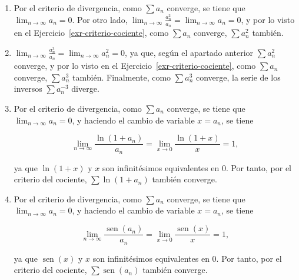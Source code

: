 \documentclass[
  spanish,
  a4paper,
]{scrreport}
\theoremstyle{definition}
\theoremstyle{remark}
\begin{document}
\begin{tcolorbox}[enhanced jigsaw, arc=.35mm, bottomrule=.15mm, bottomtitle=1mm, breakable, colback=white, colbacktitle=quarto-callout-tip-color!10!white, colframe=quarto-callout-tip-color-frame, coltitle=black, left=2mm, leftrule=.75mm, opacityback=0, opacitybacktitle=0.6, rightrule=.15mm, title=\textcolor{quarto-callout-tip-color}{\faLightbulb}\hspace{0.5em}{Solución}, titlerule=0mm, toprule=.15mm, toptitle=1mm]

\begin{enumerate}
\def\labelenumi{\alph{enumi}.}
\item
  Por el criterio de divergencia, como \(\sum a_n\) converge, se tiene
  que \(\lim_{n\to\infty} a_n = 0\). Por otro lado,
  \(\lim_{n\to\infty}\frac{a_n^2}{a_n} = \lim_{n\to\infty} a_n = 0\), y
  por lo visto en el Ejercicio~\ref{exr-criterio-cociente}, como
  \(\sum a_n\) converge, \(\sum a_n^2\) también.
\item
  \(\lim_{n\to\infty}\frac{a_n^3}{a_n} = \lim_{n\to\infty} a_n^2 = 0\),
  ya que, según el apartado anterior \(\sum a_n^2\) converge, y por lo
  visto en el Ejercicio~\ref{exr-criterio-cociente}, como \(\sum a_n\)
  converge, \(\sum a_n^3\) también. Finalmente, como \(\sum a_n^3\)
  converge, la serie de los inversos \(\sum a_n^{-3}\) diverge.
\item
  Por el criterio de divergencia, como \(\sum a_n\) converge, se tiene
  que \(\lim_{n\to\infty} a_n = 0\), y haciendo el cambio de variable
  \(x=a_n\), se tiene

  \[
   \lim_{n\to\infty} \frac{\ln(1+a_n)}{a_n} = \lim_{x\to 0}\frac{\ln(1+x)}{x} = 1,
   \]

  ya que \(\ln(1+x)\) y \(x\) son infinitésimos equivalentes en \(0\).
  Por tanto, por el criterio del cociente, \(\sum \ln(1+a_n)\) también
  converge.
\item
  Por el criterio de divergencia, como \(\sum a_n\) converge, se tiene
  que \(\lim_{n\to\infty} a_n = 0\), y haciendo el cambio de variable
  \(x=a_n\), se tiene

  \[
  \lim_{n\to\infty} \frac{\operatorname{sen}(a_n)}{a_n} = \lim_{x\to 0}\frac{\operatorname{sen}(x)}{x} = 1,
  \]

  ya que \(\operatorname{sen}(x)\) y \(x\) son infinitésimos
  equivalentes en \(0\). Por tanto, por el criterio del cociente,
  \(\sum \operatorname{sen}(a_n)\) también converge.
\end{enumerate}

\end{tcolorbox}
\end{document}
